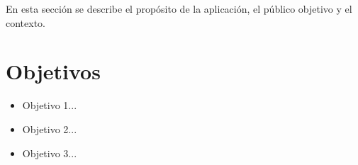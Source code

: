 En esta sección se describe el propósito de la aplicación, el público objetivo y el contexto. 
\section*{Objetivos}
\begin{itemize}
  \item Objetivo 1...
  \item Objetivo 2...
  \item Objetivo 3...
\end{itemize}
